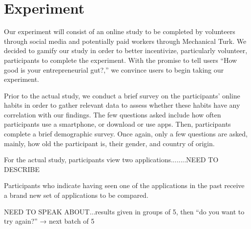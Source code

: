 \section{Experiment}

Our experiment will consist of an online study to be completed by volunteers through social media and potentially paid workers through Mechanical Turk. We decided to gamify our study in order to better incentivize, particularly volunteer, participants to complete the experiment. With the promise to tell users “How good is your entrepreneurial gut?,” we convince users to begin taking our experiment.

Prior to the actual study, we conduct a brief survey on the participants' online habits in order to gather relevant data to assess whether these habits have any correlation with our findings. The few questions asked include how often participants use a smartphone, or download or use apps. Then, participants complete a brief demographic survey. Once again, only a few questions are asked, mainly, how old the participant is, their gender, and country of origin.

For the actual study, participants view two applications........NEED TO DESCRIBE

Participants who indicate having seen one of the applications in the past receive a brand new set of applications to be compared.

NEED TO SPEAK ABOUT...results given in groups of 5, then “do you want to try again?” → next batch of 5



